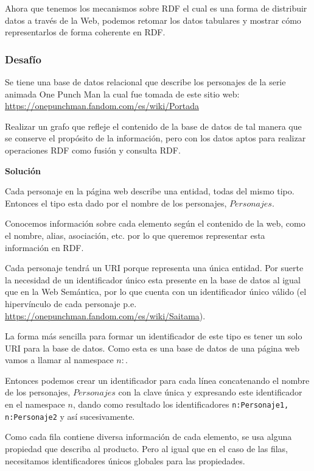 \documentclass[conference]{IEEEtran}
\begin{document}
Ahora que tenemos los mecanismos sobre RDF el cual es una forma de distribuir datos a través de la Web, podemos retomar los datos tabulares y mostrar cómo representarlos de forma coherente en RDF.

\subsubsection{Desafío}

Se tiene una base de datos relacional que describe los personajes de la serie animada One Punch Man la cual fue tomada de este sitio web: \url{https://onepunchman.fandom.com/es/wiki/Portada}\cite{b5}

 Realizar un grafo que refleje el contenido de la base de datos de tal manera que se conserve el propósito de la información, pero con los datos aptos para realizar operaciones RDF como fusión y consulta RDF.

\textbf{Solución}

Cada personaje en la página web describe una entidad, todas del mismo tipo. Entonces el tipo esta dado por el nombre de los personajes, $Personajes$.

Conocemos información sobre cada elemento según el contenido de la web, como el nombre, alias, asociación, etc. por lo que queremos representar esta información en RDF.

Cada personaje tendrá un URI porque representa una única entidad. Por suerte la necesidad de un identificador único esta presente en la base de datos al igual que en la Web Semántica, por lo que cuenta con  un identificador único válido (el hipervínculo de cada personaje p.e. \url{https://onepunchman.fandom.com/es/wiki/Saitama}\cite{b6}).

La forma más sencilla para formar un identificador de este tipo es tener un solo URI para la base de datos. Como esta es una base de datos de una página web vamos a llamar al namespace $n:$.

Entonces podemos crear un identificador para cada línea concatenando el nombre de los personajes, $Personajes$ con la clave única y expresando este identificador en el namespace $n$, dando como resultado los identificadores \texttt{n:Personaje1, n:Personaje2}
y así sucesivamente. 

Como cada fila contiene diversa información de cada elemento, se usa alguna propiedad que describa al producto. Pero al igual que en el caso de las filas, necesitamos identificadores únicos globales para las propiedades.
\end{document}
